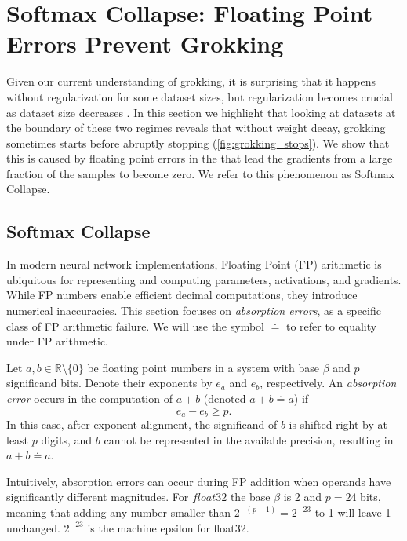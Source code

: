 





\section{Softmax Collapse: Floating Point Errors Prevent Grokking} \label{sec:floating_points}

Given our current understanding of grokking, it is surprising that it happens without regularization for some dataset sizes, but regularization becomes crucial as dataset size decreases \citep{power2022grokking}. In this section we highlight that looking at datasets at the boundary of these two regimes reveals that without weight decay, grokking sometimes starts before abruptly stopping (\cref{fig:grokking_stops}). We show that this is caused by floating point errors in the \softmax that lead the gradients from a large fraction of the samples to become zero. We refer to this phenomenon as Softmax Collapse. 

\subsection{Softmax Collapse}

In modern neural network implementations, Floating Point (FP) arithmetic is ubiquitous for representing and computing parameters, activations, and gradients. While FP numbers enable efficient decimal computations, they introduce numerical inaccuracies. This section focuses on \textit{absorption errors}, as a specific class of FP arithmetic failure. We will use the symbol $\doteq$ to refer to equality under FP arithmetic.

\begin{dfn}
Let $a, b \in \mathbb{R}\setminus\{0\}$ be floating point numbers in a system with base $\beta$ and $p$ significand bits. Denote their exponents by $e_a$ and $e_b$, respectively. An \emph{absorption error} occurs in the computation of $a + b$ (denoted $a + b \doteq a$) if
\[
e_a - e_b \geq p.
\]
In this case, after exponent alignment, the significand of $b$ is shifted right by at least $p$ digits, and $b$ cannot be represented in the available precision, resulting in $a + b \doteq a$.
\end{dfn}

Intuitively, absorption errors can occur during FP addition when operands have significantly different magnitudes. For $float32$ the base $\beta$ is 2 and $p=24$ bits, meaning that adding any number smaller than $2^{-(p-1)}=2^{-23} $ to 1 will leave 1 unchanged. $2^{-23}$ is the machine epsilon for float32.

